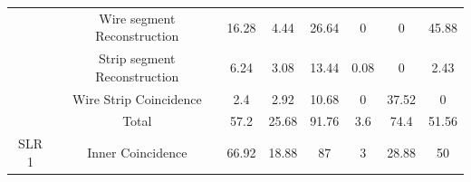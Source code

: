 \begin{table}[]
\begin{tabular}{|c|c|c|c|c|c|c|c|}
                                                                                & Wire segment Reconstruction  & 16.28                                                     & 4.44                                                      & 26.64                                                    & 0                                                                 & 0                                                      & 45.88                                                  \\ \cline{2-8} 
                                                                                & Strip segment Reconstruction & 6.24                                                      & 3.08                                                      & 13.44                                                    & 0.08                                                              & 0                                                      & 2.43                                                   \\ \cline{2-8} 
                                                                                & Wire Strip Coincidence       & 2.4                                                       & 2.92                                                      & 10.68                                                    & 0                                                                 & 37.52                                                  & 0                                                      \\ \cline{2-8} 
                                                                                & Total                        & 57.2                                                      & 25.68                                                     & 91.76                                                    & 3.6                                                               & 74.4                                                   & 51.56                                                  \\ \hline\hline
    \multirow{3}{*}{SLR 1}                                                       & Inner Coincidence            & 66.92                                                     & 18.88                                                     & 87                                                       & 3                                                                 & 28.88                                                  & 50                                                     \\ \cline{2-8} 

\end{tabular}
\end{table}
